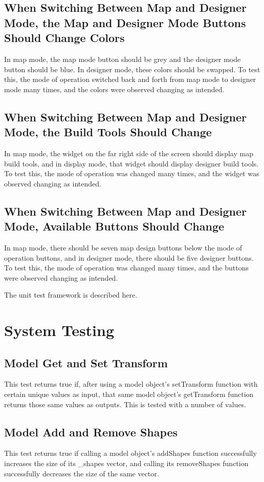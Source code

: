 \subsection{When Switching Between Map and Designer Mode, the Map and Designer Mode Buttons Should Change Colors}
In map mode, the map mode button should be grey and the designer mode button should be blue. In designer mode, these colors should be swapped. To test this, the mode of operation switched back and forth from map mode to designer mode many times, and the colors were observed changing as intended.

\subsection{When Switching Between Map and Designer Mode, the Build Tools Should Change}
In map mode, the widget on the far right side of the screen should display map build tools, and in display mode, that widget should display designer build tools. To test this, the mode of operation was changed many times, and the widget was observed changing as intended.

\subsection{When Switching Between Map and Designer Mode, Available Buttons Should Change}
In map mode, there should be seven map design buttons below the mode of operation buttons, and in designer mode, there should be five designer buttons. To test this, the mode of operation was changed many times, and the buttons were observed changing as intended.

The unit test framework is described here.   

\section{System Testing}

\subsection{Model Get and Set Transform}
This test returns true if, after using a model object's setTransform function with certain unique values as input, that same model object's getTransform function returns those same values as outputs. This is tested with a number of values.

\subsection{Model Add and Remove Shapes}
This test returns true if calling a model object's addShapes function successfully increases the size of its \_shapes vector, and calling its removeShapes function successfully decreases the size of the same vector.

